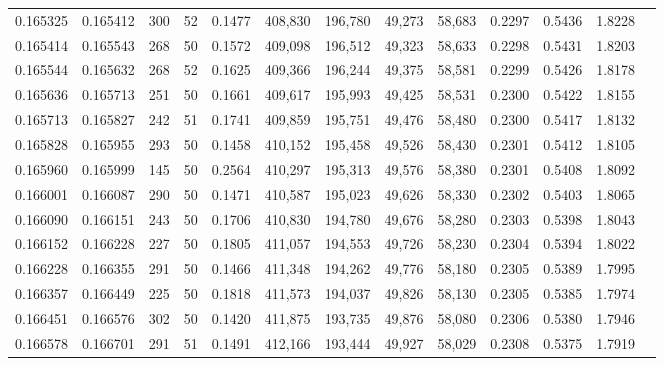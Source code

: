 \begin{tabular}{rrrrrrrrrrrrr}
0.165325 & 0.165412 &   300 &  52 &                                     0.1477 & 408,830 & 196,780 &  49,273 &  58,683 & 0.2297 & 0.5436 & 1.8228 \\
0.165414 & 0.165543 &   268 &  50 &                                     0.1572 & 409,098 & 196,512 &  49,323 &  58,633 & 0.2298 & 0.5431 & 1.8203 \\
0.165544 & 0.165632 &   268 &  52 &                                     0.1625 & 409,366 & 196,244 &  49,375 &  58,581 & 0.2299 & 0.5426 & 1.8178 \\
0.165636 & 0.165713 &   251 &  50 &                                     0.1661 & 409,617 & 195,993 &  49,425 &  58,531 & 0.2300 & 0.5422 & 1.8155 \\
0.165713 & 0.165827 &   242 &  51 &                                     0.1741 & 409,859 & 195,751 &  49,476 &  58,480 & 0.2300 & 0.5417 & 1.8132 \\
0.165828 & 0.165955 &   293 &  50 &                                     0.1458 & 410,152 & 195,458 &  49,526 &  58,430 & 0.2301 & 0.5412 & 1.8105 \\
0.165960 & 0.165999 &   145 &  50 &                                     0.2564 & 410,297 & 195,313 &  49,576 &  58,380 & 0.2301 & 0.5408 & 1.8092 \\
0.166001 & 0.166087 &   290 &  50 &                                     0.1471 & 410,587 & 195,023 &  49,626 &  58,330 & 0.2302 & 0.5403 & 1.8065 \\
0.166090 & 0.166151 &   243 &  50 &                                     0.1706 & 410,830 & 194,780 &  49,676 &  58,280 & 0.2303 & 0.5398 & 1.8043 \\
0.166152 & 0.166228 &   227 &  50 &                                     0.1805 & 411,057 & 194,553 &  49,726 &  58,230 & 0.2304 & 0.5394 & 1.8022 \\
0.166228 & 0.166355 &   291 &  50 &                                     0.1466 & 411,348 & 194,262 &  49,776 &  58,180 & 0.2305 & 0.5389 & 1.7995 \\
0.166357 & 0.166449 &   225 &  50 &                                     0.1818 & 411,573 & 194,037 &  49,826 &  58,130 & 0.2305 & 0.5385 & 1.7974 \\
0.166451 & 0.166576 &   302 &  50 &                                     0.1420 & 411,875 & 193,735 &  49,876 &  58,080 & 0.2306 & 0.5380 & 1.7946 \\
0.166578 & 0.166701 &   291 &  51 &                                     0.1491 & 412,166 & 193,444 &  49,927 &  58,029 & 0.2308 & 0.5375 & 1.7919 \\

\end{tabular}
